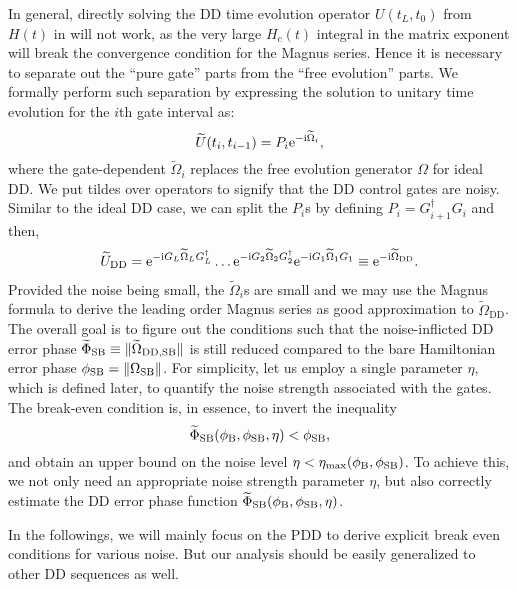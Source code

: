\documentclass[b5paper,11pt]{article}
\newcommand{\wtO}{\widetilde{\Omega}}
\newcommand{\wtU}{\widetilde{U}}
\newcommand{\wtep}{\widetilde{\Phi}_\mathrm{SB}}
\newcommand{\rDD}{\mathrm{DD}}
\newcommand{\rmax}{\mathrm{max}}
\begin{document}
In general, directly solving the DD time evolution operator $U(t_L,t_0)$ from $H(t)$ in  will not work, as the very large $H_c(t)$ integral in the matrix exponent will break the convergence condition for the Magnus series. Hence it is necessary to separate out the ``pure gate'' parts from the ``free evolution'' parts. We formally perform such separation  by  expressing the solution to unitary time evolution for the $i$th gate interval as:
\begin{equation}\label{eq:noisy-gate-formal}
 \wtU(t_i,t_{i-1})
 = P_i \upe^{-\upi \wtO_i}, 
\end{equation}
where the gate-dependent $\wtO_i$ replaces the free evolution generator $\Omega$ for ideal DD. 
We put tildes over operators to signify that the DD control gates are noisy. 
Similar to the ideal DD case, we can split the $P_i$s by defining $P_i=G_{i+1}^\dagger G_{i}$ and then,
\begin{equation}
\begin{aligned}
  \wtU_\rDD= \upe^{-\upi  G_L \wtO_L  G_L^\dagger} \ldots
  \upe^{-\upi G_2 \wtO_2  G_2^\dagger} \upe^{-\upi G_1\wtO_1G_1}\equiv\upe^{-\upi\wtO_\rDD} .
\end{aligned}
\end{equation}
Provided the noise being small, the $\wtO_i$s are small and we may use the Magnus formula to derive the leading order Magnus series as good approximation to $\wtO_\rDD$.
The overall goal is to figure out the conditions such that the noise-inflicted DD error phase $\wtep \equiv \norm{\wtO_{\rDD,\rSB}}$  is still reduced compared to the bare Hamiltonian error phase $\phi_{\mathrm{SB}} = \Vert {\Omega_{\mathrm{SB}}} \Vert$. For simplicity, let us employ a single parameter $\eta$, which is defined later,  to quantify the noise strength associated with the gates.  The break-even condition is, in essence, to invert the inequality
\begin{equation}
 \wtep(\phi_\rB,\phi_\rSB,\eta) < \phi_\rSB,
\end{equation} 
and obtain an upper bound on the noise level $\eta<\eta_{\rmax}(\phi_\rB, \phi_\rSB)$.
To achieve this, we not only need an appropriate noise strength parameter $\eta$, but also correctly estimate the DD error phase function $\wtep(\phi_\rB,\phi_\rSB,\eta)$.  

 In the followings, we will mainly focus on the PDD to derive explicit break even conditions for various noise. But our analysis should be easily generalized to other DD sequences as well.
\end{document}

